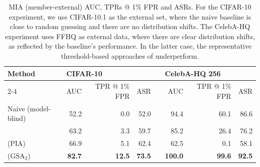 \documentclass{article}
\theoremstyle{remark}
\begin{document}
\begin{table}[t]
    \caption{MIA (member-external) AUC, TPRs @ 1\% FPR and ASRs. For the CIFAR-10 experiment, we use CIFAR-10.1 as the external set, where the naive baseline is close to random guessing and there are no distribution shifts. The CelebA-HQ experiment uses FFHQ as external data, where there are clear distribution shifts, as reflected by the baseline's performance. In the latter case, the representative threshold-based approaches of \citet{10188618, kong2024an} underperform.}
    \centering
    \setlength{\tabcolsep}{1mm}
    \begin{tabular}{@{}lrrrrrrr@{}}
           \toprule
           \multirow{2}{*}{Method} & \multicolumn{3}{l}{CIFAR-10} && \multicolumn{3}{l}{CelebA-HQ 256} \\
           \cmidrule{2-4}  \cmidrule{6-8}
           & AUC & TPR @ 1\% FPR & ASR && AUC & TPR @ 1\% FPR & ASR\\
           \midrule
            Naive (model-blind) & 52.2 & 0.0 & 52.0 && 94.4 & 60.1 & 86.6\\
            \citet{10188618} & 63.2 & 3.3 & 59.7 && 85.2 & 26.4 & 76.2\\
            \citet{kong2024an} (PIA) & 66.9 & 5.1 & 62.4 && 62.5 & 0.1 & 58.1\\ 
            \citet{pang2025whitebox} ($\text{GSA}_2$) & \textbf{82.7} & \textbf{12.5} & \textbf{73.5} && \textbf{100.0} & \textbf{99.6} & \textbf{92.5}\\
            \bottomrule

    \end{tabular}
    \label{tab:mia}
\end{table}
\end{document}
